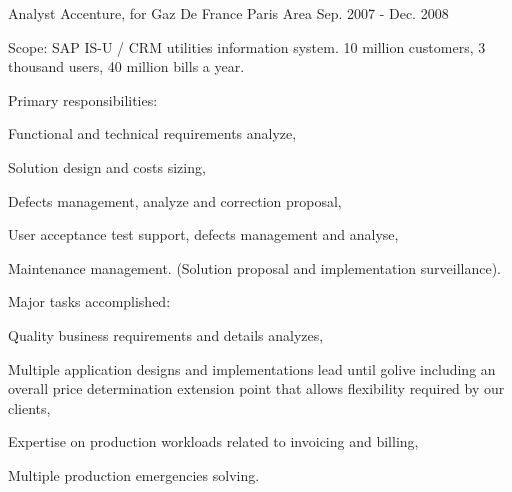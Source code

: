 \begin{cventries}
  \cventry
    {Analyst} %
    {Accenture, for Gaz De France} %
    {Paris Area} %
    {Sep. 2007 - Dec. 2008} %
    {
      \begin{cvitems} %
        \item {Scope: SAP IS-U / CRM utilities information system. 10 million customers, 3 thousand users, 40 million bills a year.}
        \item {Primary responsibilities:}
        \begin{cvsubitems}
          \item {Functional and technical requirements analyze,}
          \item {Solution design and costs sizing,}
          \item {Defects management, analyze and correction proposal,}
          \item {User acceptance test support, defects management and analyse,}
          \item {Maintenance management. (Solution proposal and implementation surveillance).}
        \end{cvsubitems}
        \item {Major tasks accomplished:}
        \begin{cvsubitems}
          \item {Quality business requirements and details analyzes,}
          \item {Multiple application designs and implementations lead until golive including an overall price determination extension point that allows flexibility required by our clients,}
          \item {Expertise on production workloads related to invoicing and billing,}
          \item {Multiple production emergencies solving.}
        \end{cvsubitems}
      \end{cvitems}
    }


\end{cventries}
